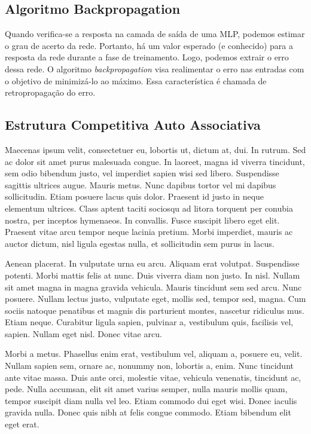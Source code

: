 \subsection{Algoritmo Backpropagation}


Quando verifica-se a resposta na camada de saída de uma MLP, podemos estimar o grau de acerto da rede. Portanto, há um valor esperado (e conhecido) para a resposta da rede durante a fase de treinamento. Logo, podemos extrair o erro dessa rede. O algoritmo \textit{backpropagation} visa realimentar o erro nas entradas com o objetivo de minimizá-lo ao máximo. Essa característica é chamada de retropropagação do erro.

\subsection{Estrutura Competitiva Auto Associativa}

Maecenas ipsum velit, consectetuer eu, lobortis ut, dictum at, dui. In rutrum. Sed ac dolor sit amet purus malesuada congue. In laoreet, magna id viverra tincidunt, sem odio bibendum justo, vel imperdiet sapien wisi sed libero. Suspendisse sagittis ultrices augue. Mauris metus. Nunc dapibus tortor vel mi dapibus sollicitudin. Etiam posuere lacus quis dolor. Praesent id justo in neque elementum ultrices. Class aptent taciti sociosqu ad litora torquent per conubia nostra, per inceptos hymenaeos. In convallis. Fusce suscipit libero eget elit. Praesent vitae arcu tempor neque lacinia pretium. Morbi imperdiet, mauris ac auctor dictum, nisl ligula egestas nulla, et sollicitudin sem purus in lacus.



Aenean placerat. In vulputate urna eu arcu. Aliquam erat volutpat. Suspendisse potenti. Morbi mattis felis at nunc. Duis viverra diam non justo. In nisl. Nullam sit amet magna in magna gravida vehicula. Mauris tincidunt sem sed arcu. Nunc posuere. Nullam lectus justo, vulputate eget, mollis sed, tempor sed, magna. Cum sociis natoque penatibus et magnis dis parturient montes, nascetur ridiculus mus. Etiam neque. Curabitur ligula sapien, pulvinar a, vestibulum quis, facilisis vel, sapien. Nullam eget nisl. Donec vitae arcu.

Morbi a metus. Phasellus enim erat, vestibulum vel, aliquam a, posuere eu, velit. Nullam sapien sem, ornare ac, nonummy non, lobortis a, enim. Nunc tincidunt ante vitae massa. Duis ante orci, molestie vitae, vehicula venenatis, tincidunt ac, pede. Nulla accumsan, elit sit amet varius semper, nulla mauris mollis quam, tempor suscipit diam nulla vel leo. Etiam commodo dui eget wisi. Donec iaculis gravida nulla. Donec quis nibh at felis congue commodo. Etiam bibendum elit eget erat.

